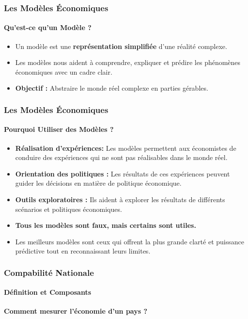 \documentclass{beamer}
\begin{document}
\begin{frame}
    \frametitle{Les Modèles Économiques}
    \framesubtitle{Qu'est-ce qu'un Modèle ?}
        \begin{itemize}
            \item Un modèle est une \textbf{représentation simplifiée} d'une réalité complexe.
            \item Les modèles nous aident à comprendre, expliquer et prédire les phénomènes économiques avec un cadre clair.
            \item \textbf{Objectif :} Abstraire le monde réel complexe en parties gérables.
        \end{itemize}
    \end{frame}
    \begin{frame}
        \frametitle{Les Modèles Économiques}
        \framesubtitle{Pourquoi Utiliser des Modèles ?}
        \begin{itemize}
            \item \textbf{Réalisation d'expériences:} Les modèles permettent aux économistes de conduire des expériences qui ne sont pas réalisables dans le monde réel.
            \item \textbf{Orientation des politiques :} Les résultats de ces expériences peuvent guider les décisions en matière de politique économique.
            \item \textbf{Outils exploratoires :} Ils aident à explorer les résultats de différents scénarios et politiques économiques.
            \item \textbf{Tous les modèles sont faux, mais certains sont utiles.}
            \item Les meilleurs modèles sont ceux qui offrent la plus grande clarté et puissance prédictive tout en reconnaissant leurs limites.
        \end{itemize}
    \end{frame}
    
\begin{frame}
    \frametitle{Compabilité Nationale}
    \framesubtitle{Définition et Composants}
        \textbf{Comment mesurer l'économie d'un pays ?}
\end{frame}
\end{document}
